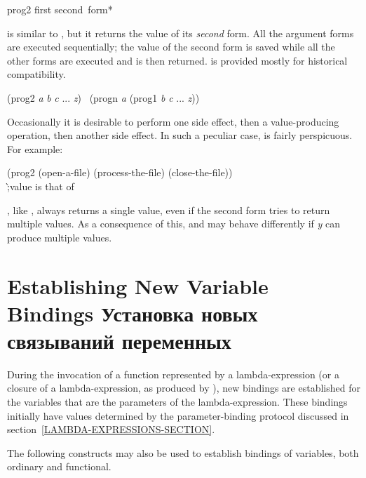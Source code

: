 \begin{defmac}
prog2 first second {\,form}*

 is similar to , but it returns the value of
its \emph{second} form.  All the argument forms are executed sequentially;
the value of the second form
is saved while all the other forms are executed and is then returned.
 is provided mostly for historical compatibility.
\begin{lisp}
(prog2 \emph{a} \emph{b} \emph{c} ... \emph{z}) \EQ\ (progn \emph{a} (prog1 \emph{b} \emph{c} ... \emph{z}))
\end{lisp}
Occasionally it is desirable to perform one side effect, then a value-producing
operation, then another side effect.  In such a peculiar case, 
is fairly perspicuous.
For example:
\begin{lisp}
(prog2 (open-a-file) (process-the-file) (close-the-file)) \\
\`;\textrm{value is that of }
\end{lisp}

, like ,
always returns a single value, even if the second form
tries to return multiple values.  As a consequence of this,
 and  may behave differently
if \emph{y} can produce multiple values.
\end{defmac}


\section{Establishing New Variable Bindings Установка новых связываний переменных}
\label{VAR-BINDING-SECTION}

During the invocation of
a function represented by a lambda-expression (or a closure of
a lambda-expression, as produced by ),
new bindings are established for the variables that are the
parameters of the lambda-expression.  These bindings initially
have values determined by the parameter-binding protocol discussed
in section~\ref{LAMBDA-EXPRESSIONS-SECTION}.

The following constructs may also be used to establish bindings of variables,
both ordinary and functional.

